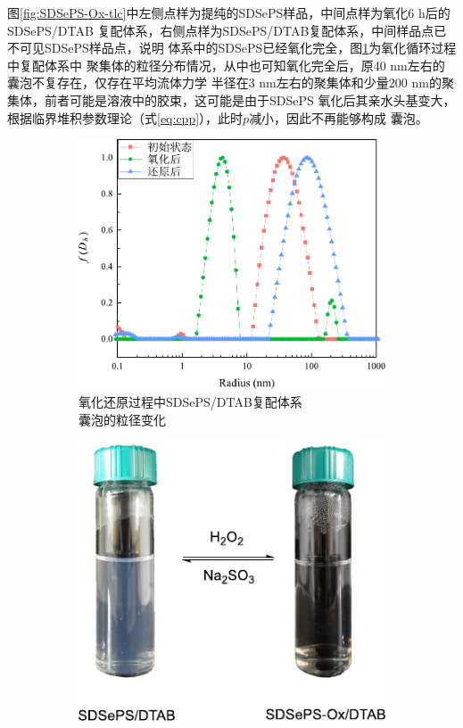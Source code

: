 \documentclass[bachelor,fandolfonts,replaceperiod]{jnuthesis}
\begin{document}
    图\ref{fig:SDSePS-Ox-tlc}中左侧点样为提纯的SDSePS样品，中间点样为氧化6 h后的SDSePS/DTAB
    复配体系，右侧点样为SDSePS/DTAB复配体系，中间样品点已不可见SDSePS样品点，说明
    体系中的SDSePS已经氧化完全，图\ref{fig:SDSePS-redox-radius}为氧化循环过程中复配体系中
    聚集体的粒径分布情况，从中也可知氧化完全后，原40 nm左右的囊泡不复存在，仅存在平均流体力学
    半径在3 nm左右的聚集体和少量200 nm的聚集体，前者可能是溶液中的胶束，这可能是由于SDSePS
    氧化后其亲水头基变大，根据临界堆积参数理论（式\ref{eq:cpp}），此时$p$减小，因此不再能够构成
    囊泡。
    
    \begin{figure}[htbp]
        \begin{subfigure}[]{.5\textwidth}
            \centering
            \includegraphics[width=.98\textwidth]{figure/SDSePS-redox-radius.pdf}
            \caption{氧化还原过程中SDSePS/DTAB复配体系\\ 囊泡的粒径变化}\label{fig:SDSePS-redox-radius}
        \end{subfigure}%
        \begin{subfigure}[]{.5\textwidth}
            \centering
            \includegraphics[width=.8\textwidth]{figure/scheme-SDSePS-redox.pdf}

\end{subfigure}
\end{figure}
\end{document}
